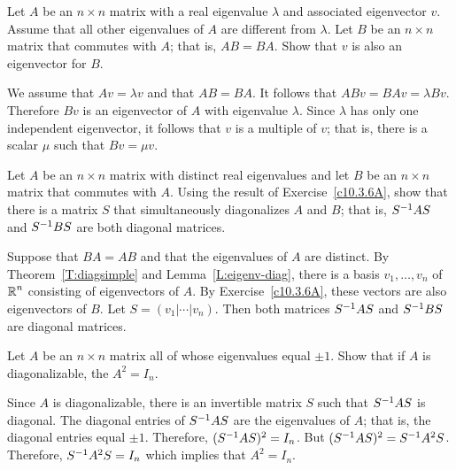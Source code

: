 \documentclass{ximera}
\begin{document}
\begin{exercise} \label{c10.3.6A}
Let $A$ be an $n\times n$ matrix with a real eigenvalue $\lambda$ and 
associated eigenvector $v$.  Assume that all other eigenvalues of $A$ are
different from $\lambda$.  Let $B$ be an $n\times n$ matrix that commutes
with $A$; that is, $AB=BA$.  Show that $v$ is also an eigenvector for $B$.

\begin{solution}
We assume that $Av=\lambda v$ and that $AB=BA$.  It follows that 
$ABv=BAv=\lambda Bv$.  Therefore $Bv$ is an eigenvector of $A$ with eigenvalue
$\lambda$.  Since $\lambda$ has only one independent eigenvector, it follows that 
$v$ is a multiple of $v$; that is, there is a scalar $\mu$ such that $Bv=\mu v$.

\end{solution}
\end{exercise}

\begin{exercise} \label{c10.3.6B}
Let $A$ be an $n\times n$ matrix with distinct real eigenvalues and let $B$ 
be an $n\times n$ matrix that commutes with $A$.  Using the result of
Exercise~\ref{c10.3.6A}, show that there is a matrix $S$ that simultaneously
diagonalizes $A$ and $B$; that is, $S^{-1} AS$ and $S^{-1} BS$ are both
diagonal matrices.

\begin{solution}
Suppose that $BA=AB$ and that the eigenvalues of $A$ are distinct. 
By Theorem~\ref{T:diagsimple} and Lemma~\ref{L:eigenv-diag}, 
there is a basis $v_1,\ldots,v_n$ of $\mbox{$\Bbb{R}$}^n$ consisting of eigenvectors of $A$.  By 
Exercise~\ref{c10.3.6A}, these vectors are also eigenvectors of $B$.  Let 
$S=(v_1|\cdots|v_n)$.  Then both matrices $S^{-1} AS$ and $S^{-1} BS$ are diagonal 
matrices.

\end{solution}
\end{exercise}

\begin{exercise} \label{c10.3.6C}
Let $A$ be an $n\times n$ matrix all of whose eigenvalues equal $\pm 1$. Show
that if $A$ is diagonalizable, the $A^2=I_n$.

\begin{solution}
Since $A$ is diagonalizable, there is an invertible matrix $S$ such 
that $S^{-1} AS$ is diagonal.  The diagonal entries of  $S^{-1} AS$ are the eigenvalues
of $A$; that is, the diagonal entries equal $\pm 1$.  Therefore, $(S^{-1} AS)^2=I_n$.
But $(S^{-1} AS)^2 = S^{-1} A^2 S$.   Therefore, $S^{-1} A^2 S=I_n$ which implies that
$A^2=I_n$.

\end{solution}
\end{exercise}
\end{document}
